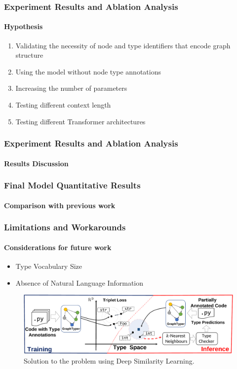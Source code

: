 \documentclass[aspectratio=169]{beamer}
\begin{document}
    \begin{frame}
        \frametitle{Experiment Results and Ablation Analysis}
        \framesubtitle{Hypothesis}
        \begin{enumerate}
            \item Validating the necessity of node and type identifiers that encode graph structure
            \item Using the model without node type annotations
            \item Increasing the number of parameters
            \item Testing different context length
            \item Testing different Transformer architectures
        \end{enumerate}
    \end{frame}

    \begin{frame}
        \frametitle{Experiment Results and Ablation Analysis}
        \framesubtitle{Results Discussion}
        \begin{table}
            \centering
            \label{tab:ablation}
            
        \end{table}
    \end{frame}

    \begin{frame}
        \frametitle{Final Model Quantitative Results}
        \framesubtitle{Comparison with previous work}
        \begin{table}
            \centering
            \label{tab:results}
            
        \end{table}
    \end{frame}

    \begin{frame}
        \frametitle{Limitations and Workarounds}
        \framesubtitle{Considerations for future work}
        \begin{itemize}
            \item Type Vocabulary Size
            \item Absence of Natural Language Information
        \end{itemize}
        \begin{figure}
            \centering
            \includegraphics[width=\textwidth]{figures/dsl.pdf}
            \caption{Solution to the problem using Deep Similarity Learning.}
            \label{fig:dsl}
        \end{figure}
    \end{frame}
\end{document}
